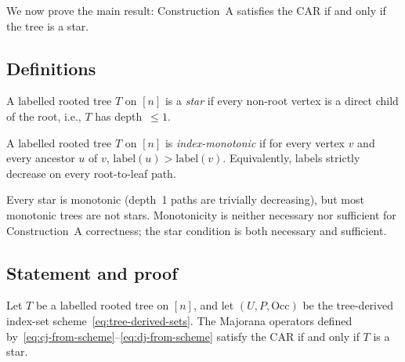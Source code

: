 %

We now prove the main result: Construction~A satisfies the CAR if and
only if the tree is a star.

\subsection{Definitions}
\label{sec:st-definitions}

\begin{definition}
\label{def:star}
A labelled rooted tree $T$ on $[n]$ is a \emph{star} if every
non-root vertex is a direct child of the root, i.e., $T$ has
depth~$\le 1$.
\end{definition}

\begin{definition}
\label{def:monotonic}
A labelled rooted tree $T$ on $[n]$ is \emph{index-monotonic} if for
every vertex $v$ and every ancestor $u$ of $v$,
$\mathrm{label}(u) > \mathrm{label}(v)$.  Equivalently, labels
strictly decrease on every root-to-leaf path.
\end{definition}

Every star is monotonic (depth~1 paths are trivially decreasing), but
most monotonic trees are not stars.  Monotonicity is neither necessary
nor sufficient for Construction~A correctness; the star condition is
both necessary and sufficient.

\subsection{Statement and proof}
\label{sec:st-proof}

\begin{theorem}
\label{thm:star-tree}
Let $T$ be a labelled rooted tree on $[n]$, and let $(U, P,
\mathrm{Occ})$ be the tree-derived index-set
scheme~\eqref{eq:tree-derived-sets}.  The Majorana operators defined
by~\eqref{eq:cj-from-scheme}--\eqref{eq:dj-from-scheme} satisfy the
CAR if and only if $T$ is a star.
\end{theorem}

